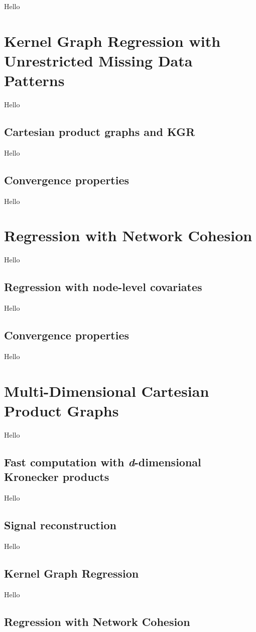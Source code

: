Hello



\section{Kernel Graph Regression with Unrestricted Missing Data Patterns}

\label{sec:kgr_mdp}

Hello

\subsection{Cartesian product graphs and KGR}

Hello

\subsection{Convergence properties}

Hello


\section{Regression with Network Cohesion}

\label{sec:rnc_mdp}

Hello

\subsection{Regression with node-level covariates}

Hello

\subsection{Convergence properties}

Hello


\section{Multi-Dimensional Cartesian Product Graphs}

\label{sec:nd_gsp}

Hello

\subsection{Fast computation with \textit{d}-dimensional Kronecker products}

Hello

\subsection{Signal reconstruction}

Hello

\subsection{Kernel Graph Regression}

Hello

\subsection{Regression with Network Cohesion}



